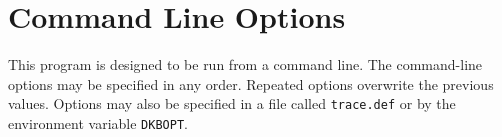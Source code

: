 \chapter{Command Line Options}

\newlength{\origitemsep}
\setlength{\origitemsep}{\itemsep}
\newcommand{\noitemsep}{\setlength{\itemsep}{-\parskip}}
\newcommand{\doitemsep}{\setlength{\itemsep}{\origitemsep}}

This program is designed to be run from a command line.  The
command-line options
may be specified in any order.  Repeated options overwrite
the previous values.  Options may also be specified in a file called
{\tt trace.def} or by
the environment variable
{\tt DKBOPT}.
